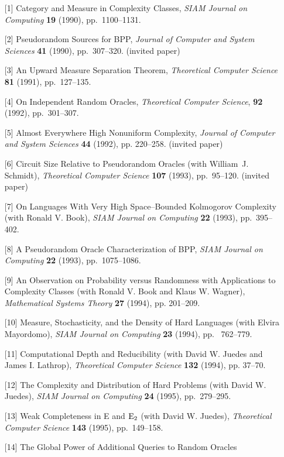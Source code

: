 \begin{enumerate}
\item[{[1]}] Category and Measure in Complexity Classes, {\it SIAM
Journal on Computing\/} {\bf 19} (1990), pp.~1100--1131.
\item[{[2]}] Pseudorandom Sources for BPP, {\it Journal of Computer and
System Sciences\/} {\bf 41} (1990), pp.~307--320. (invited paper)
\item[{[3]}] An Upward Measure Separation Theorem, {\it Theoretical
Computer Science\/} {\bf 81} (1991), pp.~127--135.
\item[{[4]}]  On Independent Random Oracles, {\it Theoretical
Computer Science}, {\bf 92} (1992), pp.~301--307.
\item[{[5]}] Almost Everywhere High Nonuniform Complexity, {\it
Journal of Computer and System Sciences} {\bf 44} (1992), pp. 220--258.
 (invited paper)
\item[{[6]}] Circuit Size Relative to Pseudorandom Oracles (with
William~J. Schmidt), {\it Theoretical Computer Science} {\bf 107}
(1993), pp.~95--120.
(invited paper)
\item[{[7]}] On Languages With Very High Space--Bounded Kolmogorov 
Complexity (with Ronald V. Book), {\it SIAM Journal on Computing}
{\bf 22} (1993), pp.~395--402.
\item[{[8]}] A Pseudorandom Oracle Characterization of BPP, {\it SIAM
Journal on Computing} {\bf 22} (1993), pp.~1075--1086.
\item[{[9]}] An Observation on Probability versus Randomness with
Applications to Complexity Classes (with Ronald V. Book and Klaus W.
Wagner), {\it Mathematical Systems Theory\/} {\bf 27} (1994), pp. 201--209.
\item[{[10]}] Measure, Stochasticity, and the Density of Hard Languages (with
Elvira Mayordomo), {\it SIAM Journal on Computing\/} {\bf 23} (1994), pp.~
762--779.
\item[{[11]}] Computational Depth and Reducibility (with David W. Juedes and
James I. Lathrop), {\it Theoretical Computer Science\/} {\bf 132} (1994), 
pp. 37--70.
\item[{[12]}] The Complexity and Distribution of Hard Problems
(with David W. Juedes), {\it SIAM Journal on Computing\/} {\bf 24} 
(1995), pp.~279--295.
\item[{[13]}] Weak Completeness in E and ${\rm E}_2$ (with David W.
Juedes), {\it Theoretical Computer Science} {\bf 143} (1995),
pp.~149--158.
\item[{[14]}] The Global Power of Additional Queries to Random Oracles

\end{enumerate}

